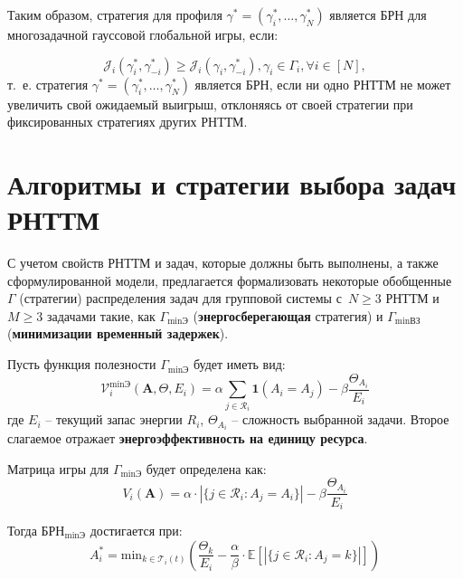 Таким образом, стратегия для профиля $\gamma^*=(\gamma_i^*, \dots, \gamma_N^*)$ является БРН для многозадачной гауссовой глобальной игры, если:

\begin{equation}
	\label{eq:gauss_ntts}
	\mathcal{J}_i\left(\gamma_i^*,\gamma_{-i}^*\right) \geq \mathcal{J}_i\left(\gamma_i,\gamma_{-i}^*\right), \gamma_i \in \Gamma_i, \forall i \in [N],
\end{equation}
т.\ е. стратегия $\gamma^*=(\gamma_i^*, \dots, \gamma_N^*)$ является БРН, если ни одно РНТТМ не может увеличить свой ожидаемый выигрыш, отклоняясь от своей стратегии при фиксированных стратегиях других РНТТМ.

\section{Алгоритмы и стратегии выбора задач РНТТМ}\label{sec:ch2/sec2}

С учетом свойств РНТТМ и задач, которые должны быть выполнены, а также сформулированной модели, предлагается формализовать некоторые обобщенные $\Gamma$ (стратегии) распределения задач для групповой системы с~$N \geq 3$ РНТТМ и $M \geq 3$ задачами такие, как $\Gamma_{\min\text{Э}}$ (\textbf{энергосберегающая} стратегия) и $\Gamma_{\min\text{ВЗ}}$ (\textbf{минимизации временный задержек}).

Пусть функция полезности $\Gamma_{\min\text{Э}}$ будет иметь вид:
\begin{equation}
	\label{eq:usefulness_ntts_energy}
	\mathcal{V}_i^{\mathrm{\min}\mathcal{\text{Э}}}(\mathbf{A}, \Theta, E_i) = \alpha \sum_{j \in \mathcal{R}_i} \mathbf{1}(A_i = A_j) - \beta \frac{\Theta_{A_i}}{E_i}
\end{equation}
где $E_i$ -- текущий запас энергии $R_i$, $\Theta_{A_i}$ -- сложность выбранной задачи. Второе слагаемое отражает \textbf{энергоэффективность на единицу ресурса}.

Матрица игры для $\Gamma_{\min\text{Э}}$ будет определена как:
\begin{equation}
	\label{eq:matrix_ntts_energy}
	V_i(\mathbf{A}) = \alpha \cdot |\{ j \in \mathcal{R}_i : A_j = A_i \}| - \beta \frac{\Theta_{A_i}}{E_i}
\end{equation}

Тогда $\text{БРН}_{\min\text{Э}}$ достигается при:
\begin{equation}
	\label{eq:brn_ntts_energy}
	A_i^* = \mathrm{min}_{k \in \mathcal{T}_i(t)} \left( \frac{\Theta_k}{E_i} - \frac{\alpha}{\beta} \cdot \mathbb{E}[|\{ j \in \mathcal{R}_i : A_j = k \}|] \right)
\end{equation}

